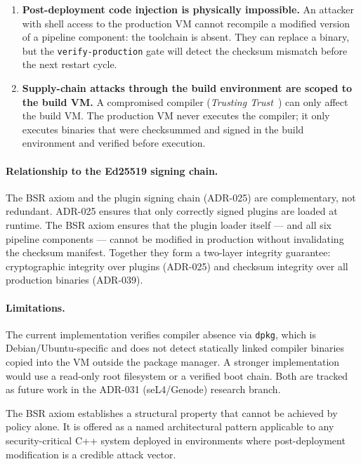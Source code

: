 \documentclass[11pt,a4paper]{article}
\begin{document}
    \begin{enumerate}
        \item \textbf{Post-deployment code injection is physically impossible.}
        An attacker with shell access to the production VM cannot recompile
        a modified version of a pipeline component: the toolchain is absent.
        They can replace a binary, but the \texttt{verify-production} gate
        will detect the checksum mismatch before the next restart cycle.

        \item \textbf{Supply-chain attacks through the build environment are
        scoped to the build VM.}
        A compromised compiler (\emph{Trusting Trust}~\cite{thompson1984})
        can only affect the build VM. The production VM never executes the
        compiler; it only executes binaries that were checksummed and signed
        in the build environment and verified before execution.
    \end{enumerate}

    \paragraph{Relationship to the Ed25519 signing chain.}
    The BSR axiom and the plugin signing chain (ADR-025) are complementary, not
    redundant. ADR-025 ensures that only correctly signed plugins are loaded at
    runtime. The BSR axiom ensures that the plugin loader itself --- and all
    six pipeline components --- cannot be modified in production without
    invalidating the checksum manifest. Together they form a two-layer integrity
    guarantee: cryptographic integrity over plugins (ADR-025) and checksum
    integrity over all production binaries (ADR-039).

    \paragraph{Limitations.}
    The current implementation verifies compiler absence via \texttt{dpkg}, which
    is Debian/Ubuntu-specific and does not detect statically linked compiler
    binaries copied into the VM outside the package manager. A stronger
    implementation would use a read-only root filesystem or a verified boot chain.
    Both are tracked as future work in the ADR-031 (seL4/Genode) research branch.

    The BSR axiom establishes a structural property that cannot be achieved by
    policy alone. It is offered as a named architectural pattern applicable to
    any security-critical C++ system deployed in environments where post-deployment
    modification is a credible attack vector.
\end{document}

